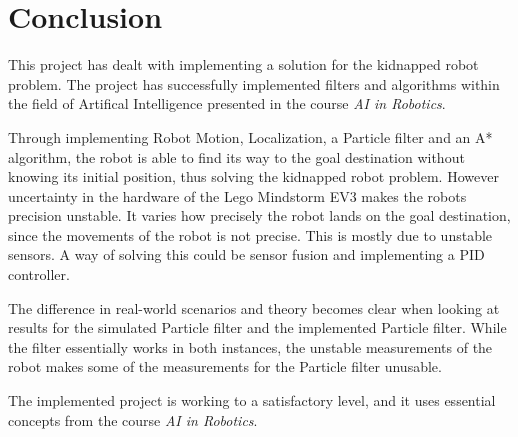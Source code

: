 \chapter{Conclusion}
\label{chp:conc}

This project has dealt with implementing a solution for the kidnapped robot problem. The project has successfully implemented filters and algorithms within the field of Artifical Intelligence presented in the course \emph{AI in Robotics}.

Through implementing Robot Motion, Localization, a Particle filter and an A* algorithm, the robot is able to find its way to the goal destination without knowing its initial position, thus solving the kidnapped robot problem. However uncertainty in the hardware of the Lego Mindstorm EV3 makes the robots precision unstable. It varies how precisely the robot lands on the goal destination, since the movements of the robot is not precise. This is mostly due to unstable sensors. A way of solving this could be sensor fusion and implementing a PID controller.

The difference in real-world scenarios and theory becomes clear when looking at  results for the simulated Particle filter and the implemented Particle filter. While the filter essentially works in both instances, the unstable measurements of the robot makes some of the measurements for the Particle filter unusable.

The implemented project is working to a satisfactory level, and it uses essential concepts from the course \emph{AI in Robotics}.
 